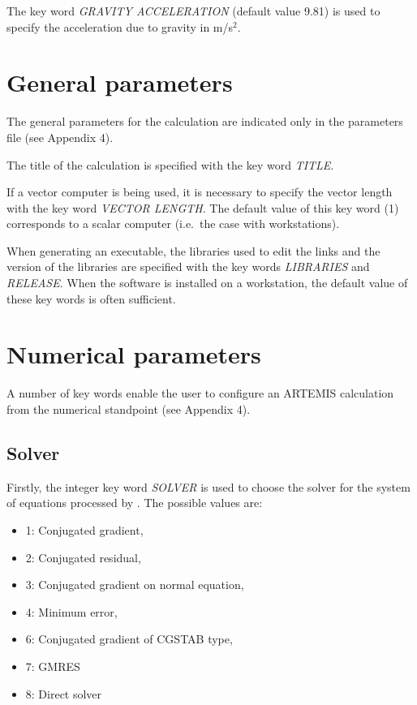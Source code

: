 The key word \textit{GRAVITY ACCELERATION} (default value 9.81) is used to
specify the acceleration due to gravity in m/s${}^{2}$.


\chapter{General parameters}

The general parameters for the calculation are indicated only in the parameters
file (see Appendix 4).

The title of the calculation is specified with the key word \textit{TITLE}.

If a vector computer is being used, it is necessary to specify the vector
length with the key word \textit{VECTOR LENGTH}. The default value of this key
word (1) corresponds to a scalar computer (i.e.\ the case with
workstations).

When generating an executable, the libraries used to edit the links and the
version of the libraries are specified with the key words \textit{LIBRARIES}
and \textit{RELEASE}. When the software is installed on a workstation, the
default value of these key words is often sufficient.


\chapter{Numerical parameters}

A number of key words enable the user to configure an ARTEMIS calculation from
the numerical standpoint (see Appendix 4).


\section{Solver}

Firstly, the integer key word \textit{SOLVER} is used to choose the solver for
the system of equations processed by \artemis{}. The possible values are:

\begin{itemize}
  \item 1: Conjugated gradient,
  \item 2: Conjugated residual,
  \item 3: Conjugated gradient on normal equation,
  \item 4: Minimum error,
  \item 6: Conjugated gradient of CGSTAB type,
  \item 7: GMRES
  \item 8: Direct solver
\end{itemize}

